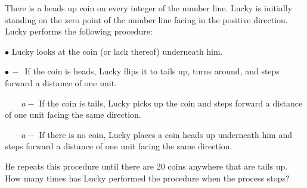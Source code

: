 There is a heads up coin on every integer of the number line. Lucky is initially standing on the zero point of the number line facing in the positive direction. Lucky performs the following procedure:

$\bullet$ Lucky looks at the coin (or lack thereof) underneath him.

$\bullet \, - \, $ If the coin is heads, Lucky flips it to tails up, turns around, and steps forward a distance of one unit.

$ \qquad a -$ If the coin is tails, Lucky picks up the coin and steps forward a distance of one unit facing the same direction.

$ \qquad a -$ If there is no coin, Lucky places a coin heads up underneath him and steps forward a distance of one unit facing the same direction.

He repeats this procedure until there are 20 coins anywhere that are tails up. How many times has Lucky performed the procedure when the process stops?